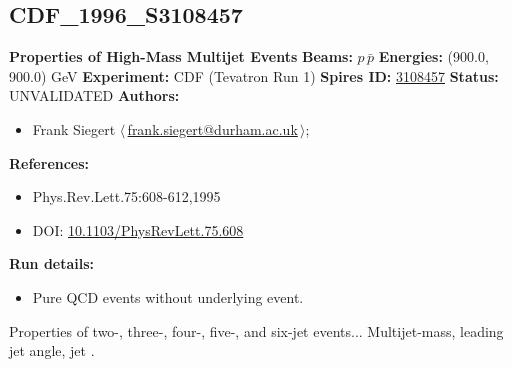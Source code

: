 \clearpage

\subsection[CDF\_1996\_S3108457]{CDF\_1996\_S3108457\,\cite{Abe:1995rw}}
\textbf{Properties of High-Mass Multijet Events}\newline
\textbf{Beams:} $p$\,$\bar{p}$ \newline
\textbf{Energies:} (900.0, 900.0) GeV \newline
\textbf{Experiment:} CDF (Tevatron Run 1) \newline
\textbf{Spires ID:} \href{http://www.slac.stanford.edu/spires/find/hep/www?rawcmd=key+3108457}{3108457}\newline
\textbf{Status:} UNVALIDATED\newline
\textbf{Authors:}
\begin{itemize}
  \item Frank Siegert $\langle\,$\href{mailto:frank.siegert@durham.ac.uk}{frank.siegert@durham.ac.uk}$\,\rangle$;
\end{itemize}
\textbf{References:}
\begin{itemize}
  \item Phys.Rev.Lett.75:608-612,1995
  \item DOI: \href{http://dx.doi.org/10.1103/PhysRevLett.75.608}{10.1103/PhysRevLett.75.608}
\end{itemize}
\textbf{Run details:}
\begin{itemize}

  \item Pure QCD events without underlying event.\end{itemize}

\noindent Properties of two-, three-, four-, five-, and six-jet events... Multijet-mass, leading jet angle, jet \pT.

\clearpage


\clearpage

